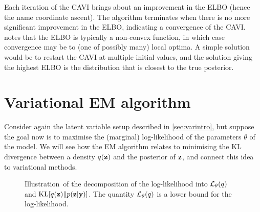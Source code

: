 Each iteration of the CAVI brings about an improvement in the ELBO (hence the name coordinate ascent).
The algorithm terminates when there is no more significant improvement in the ELBO, indicating a convergence of the CAVI.
\citet{blei2017variational} notes that the ELBO is typically a non-convex function, in which case convergence may be to (one of possibly many) local optima.
A simple solution would be to restart the CAVI at multiple initial values, and the solution giving the highest ELBO is the distribution that is closest to the true posterior.

\section{Variational EM algorithm}
\label{sec:varEM}


Consider again the latent variable setup described in \cref{sec:varintro}, but suppose the goal now is to maximise the (marginal) log-likelihood of the parameters $\theta$ of the model.
We will see how the EM algorithm relates to minimising the KL divergence between a density $q({\mathbf z})$ and the posterior of ${\mathbf z}$, and connect this idea to variational methods.

\begin{figure}[t]
  \centering
  \energyem 
  \caption[Illustration of the decomposition of the log likelihood.]{Illustration\footnotemark~of the decomposition of the log-likelihood into ${\mathcal L}_\theta(q)$ and $\operatorname{KL}[q({\mathbf z}) \Vert p({\mathbf z}|{\mathbf y})]$. The quantity ${\mathcal L}_\theta(q)$ is a lower bound for the log-likelihood.}
  \label{fig:loglikdecomp}
\end{figure}

